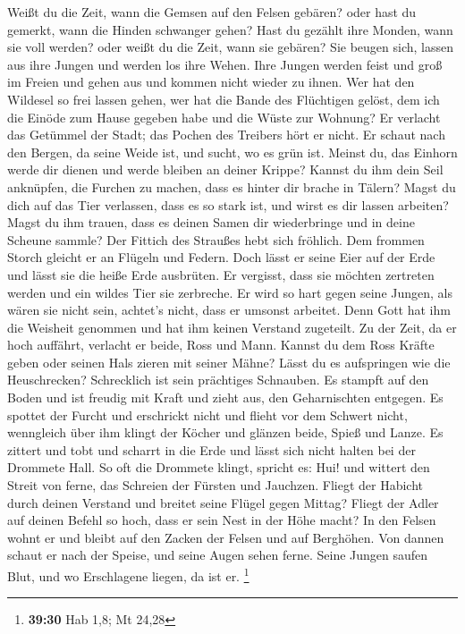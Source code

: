  Weißt du die Zeit, wann die Gemsen auf den Felsen gebären?
oder hast du gemerkt, wann die Hinden schwanger gehen?  Hast
du gezählt ihre Monden, wann sie voll werden? oder weißt du die Zeit,
wann sie gebären?  Sie beugen sich, lassen aus ihre Jungen
und werden los ihre Wehen.  Ihre Jungen werden feist und
groß im Freien und gehen aus und kommen nicht wieder zu ihnen.
 Wer hat den Wildesel so frei lassen gehen, wer hat die
Bande des Flüchtigen gelöst,  dem ich die Einöde zum Hause
gegeben habe und die Wüste zur Wohnung?  Er verlacht das
Getümmel der Stadt; das Pochen des Treibers hört er nicht. 
Er schaut nach den Bergen, da seine Weide ist, und sucht, wo es grün
ist.  Meinst du, das Einhorn werde dir dienen und werde
bleiben an deiner Krippe?  Kannst du ihm dein Seil
anknüpfen, die Furchen zu machen, dass es hinter dir brache in Tälern?
 Magst du dich auf das Tier verlassen, dass es so stark
ist, und wirst es dir lassen arbeiten?  Magst du ihm
trauen, dass es deinen Samen dir wiederbringe und in deine Scheune
sammle?  Der Fittich des Straußes hebt sich fröhlich. Dem
frommen Storch gleicht er an Flügeln und Federn.  Doch
lässt er seine Eier auf der Erde und lässt sie die heiße Erde ausbrüten.
 Er vergisst, dass sie möchten zertreten werden und ein
wildes Tier sie zerbreche.  Er wird so hart gegen seine
Jungen, als wären sie nicht sein, achtet's nicht, dass er umsonst
arbeitet.  Denn Gott hat ihm die Weisheit genommen und hat
ihm keinen Verstand zugeteilt.  Zu der Zeit, da er hoch
auffährt, verlacht er beide, Ross und Mann.  Kannst du dem
Ross Kräfte geben oder seinen Hals zieren mit seiner Mähne?
 Lässt du es aufspringen wie die Heuschrecken? Schrecklich
ist sein prächtiges Schnauben.  Es stampft auf den Boden
und ist freudig mit Kraft und zieht aus, den Geharnischten entgegen.
 Es spottet der Furcht und erschrickt nicht und flieht vor
dem Schwert nicht,  wenngleich über ihm klingt der Köcher
und glänzen beide, Spieß und Lanze.  Es zittert und tobt
und scharrt in die Erde und lässt sich nicht halten bei der Drommete
Hall.  So oft die Drommete klingt, spricht es: Hui! und
wittert den Streit von ferne, das Schreien der Fürsten und Jauchzen.
 Fliegt der Habicht durch deinen Verstand und breitet seine
Flügel gegen Mittag?  Fliegt der Adler auf deinen Befehl so
hoch, dass er sein Nest in der Höhe macht?  In den Felsen
wohnt er und bleibt auf den Zacken der Felsen und auf Berghöhen.
 Von dannen schaut er nach der Speise, und seine Augen
sehen ferne.  Seine Jungen saufen Blut, und wo Erschlagene
liegen, da ist er. \footnote{\textbf{39:30} Hab 1,8; Mt 24,28}

